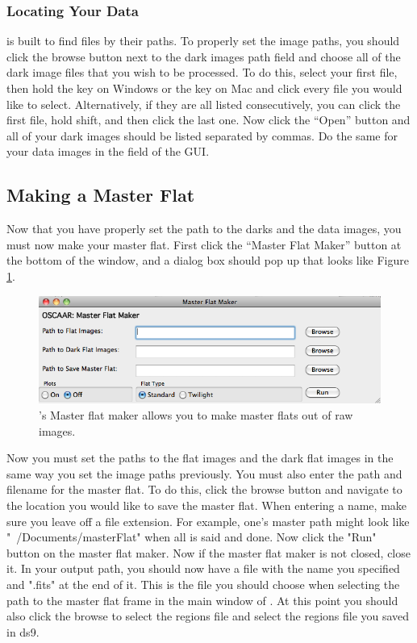 \documentclass{article}
\begin{document}
\subsubsection{Locating Your Data}

	\oscaar  is built to find files by their paths. To properly set the image paths, you should click the browse button next to the dark images path field and choose all of the dark image files that you wish to be processed. To do this, select your first file, then hold the  key on Windows or the  key on Mac and click every file you would like to select. Alternatively, if they are all listed consecutively, you can click the first file, hold shift, and then click the last one. Now click the ``Open'' button and all of your dark images should be listed separated by commas. Do the same for your data images in the  field of the \oscaar GUI.
	
\subsection{Making a Master Flat}
Now that you have properly set the path to the darks and the data images, you must now make your master flat. First click the ``Master Flat Maker'' button at the bottom of the \oscaar window, and a dialog box should pop up that looks like Figure \ref{fig:flats}.
\begin{figure}[h]
\begin{center}
\includegraphics[scale=0.25]{imgs/flatMaker.png}
\caption{\oscaar's Master flat maker allows you to make master flats out of raw images.}
\label{fig:flats}
\end{center}	
\end{figure}

Now you must set the paths to the flat images and the dark flat images in the same way you set the image paths previously. You must also enter the path and filename for the master flat. To do this, click the browse button and navigate to the location you would like to save the master flat. When entering a name, make sure you leave off a file extension. For example, one's master path might look like "~/Documents/masterFlat" when all is said and done. Now click the "Run" button on the master flat maker. Now if the master flat maker is not closed, close it. In your output path, you should now have a file with the name you specified and ".fits" at the end of it. This is the file you should choose when selecting the path to the master flat frame in the main window of \oscaar. At this point you should also click the browse to select the regions file and select the regions file you saved in ds9.
\end{document}

